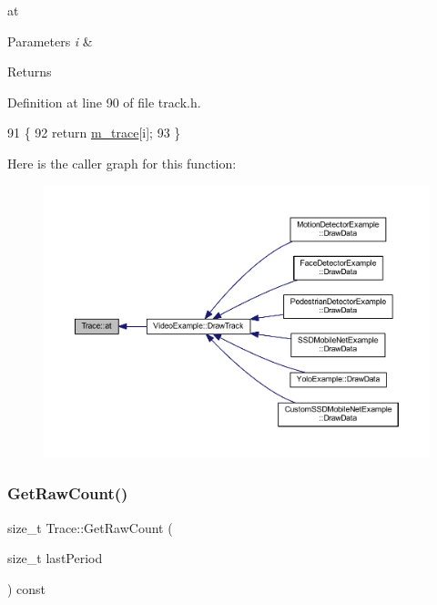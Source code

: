 at 


\begin{DoxyParams}{Parameters}
{\em i} & \\
\hline
\end{DoxyParams}
\begin{DoxyReturn}{Returns}

\end{DoxyReturn}


Definition at line 90 of file track.\+h.


\begin{DoxyCode}
91     \{
92         \textcolor{keywordflow}{return} \mbox{\hyperlink{class_trace_a2650850103966a19b5cbac6db8df8b66}{m\_trace}}[i];
93     \}
\end{DoxyCode}
Here is the caller graph for this function\+:\nopagebreak
\begin{figure}[H]
\begin{center}
\leavevmode
\includegraphics[width=350pt]{class_trace_a275e31cde73ea1ba7f51c17191aefcd5_icgraph}
\end{center}
\end{figure}
\mbox{\label{class_trace_abef223bff681cc1165abfeb80c4f1267}} 
\subsubsection{\texorpdfstring{Get\+Raw\+Count()}{GetRawCount()}}
{\footnotesize\ttfamily size\+\_\+t Trace\+::\+Get\+Raw\+Count (\begin{DoxyParamCaption}\item[{size\+\_\+t}]{last\+Period }\end{DoxyParamCaption}) const\hspace{0.3cm}{\ttfamily [inline]}}



